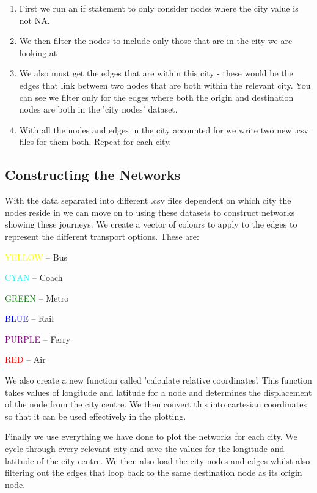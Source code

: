 \begin{enumerate}
  \item First we run an if statement to only consider nodes where the city value is not NA.
  \item We then filter the nodes to include only those that are in the city we are looking at
  \item We also must get the edges that are within this city - these would be the edges that link between two nodes that are both within the relevant city. You can see we filter only for the edges where both the origin and destination nodes are both in the 'city nodes' dataset.
  \item With all the nodes and edges in the city accounted for we write two new .csv files for them both. Repeat for each city.
\end{enumerate}

\subsection{Constructing the Networks}

    With the data separated into different .csv files dependent on which city the nodes reside in we can move on to using these datasets to construct networks showing these journeys. We create a vector of colours to apply to the edges to represent the different transport options. These are:

\textcolor{yellow}{YELLOW} – Bus

\textcolor{cyan}{CYAN} – Coach

\textcolor{green}{GREEN} – Metro

\textcolor{blue}{BLUE} – Rail

\textcolor{purple}{PURPLE} – Ferry

\textcolor{red}{RED} – Air

We also create a new function called 'calculate relative coordinates'. This function takes values of longitude and latitude for a node and determines the displacement of the node from the city centre. We then convert this into cartesian coordinates so that it can be used effectively in the plotting.

Finally we use everything we have done to plot the networks for each city. We cycle through every relevant city and save the values for the longitude and latitude of the city centre. We then also load the city nodes and edges whilst also filtering out the edges that loop back to the same destination node as its origin node.

